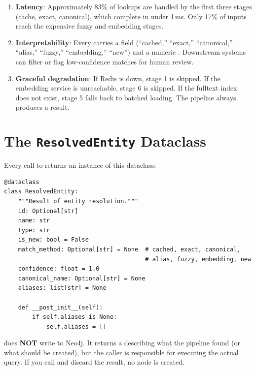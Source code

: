 \begin{enumerate}
    \item \textbf{Latency}: Approximately 83\% of lookups are handled by
          the first three stages (cache, exact, canonical), which
          complete in under 1\,ms.  Only 17\% of inputs reach the
          expensive fuzzy and embedding stages.
    \item \textbf{Interpretability}: Every  carries a
           field (``cached,'' ``exact,'' ``canonical,''
          ``alias,'' ``fuzzy,'' ``embedding,'' ``new'') and a numeric
          .  Downstream systems can filter or flag
          low-confidence matches for human review.
    \item \textbf{Graceful degradation}: If Redis is down, stage 1 is
          skipped.  If the embedding service is unreachable, stage 6 is
          skipped.  If the fulltext index does not exist, stage 5 falls
          back to batched loading.  The pipeline always produces a
          result.
\end{enumerate}


\section{The \texttt{ResolvedEntity} Dataclass}
\label{sec:resolved-entity}

Every call to  returns an instance of this dataclass:

\begin{lstlisting}[style=python, caption={The \ic{ResolvedEntity} dataclass from \codefile{models/ontology.py}.}]
@dataclass
class ResolvedEntity:
    """Result of entity resolution."""
    id: Optional[str]
    name: str
    type: str
    is_new: bool = False
    match_method: Optional[str] = None  # cached, exact, canonical,
                                        # alias, fuzzy, embedding, new
    confidence: float = 1.0
    canonical_name: Optional[str] = None
    aliases: list[str] = None

    def __post_init__(self):
        if self.aliases is None:
            self.aliases = []
\end{lstlisting}

\begin{warning}
 does \textbf{NOT} write to Neo4j.  It returns a
 describing what the pipeline found (or what should be
created), but the caller is responsible for executing the actual
 query.  If you call  and discard the result,
no node is created.
\end{warning}


